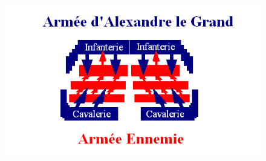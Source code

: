 \documentclass{article}
\begin{document}
\begin{figure}[H]
	\begin{centering}
	\includegraphics[width=0.8\linewidth]{../ressources/enclume2}
	\caption{}
	\end{centering}
\end{figure}
\cite{Alexanders_tactics}
\end{document}
